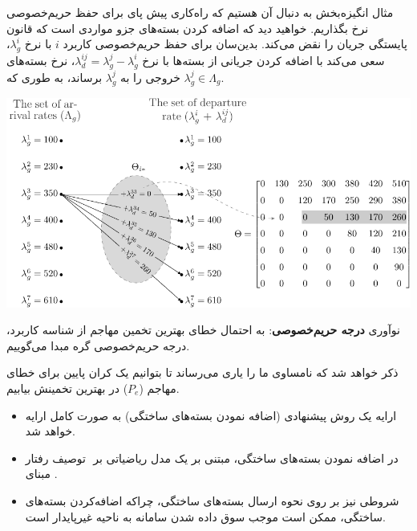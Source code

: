 \documentclass[debug,a0paper,portrait,persian]{xebaposter}
\begin{document}
\begin{poster}
\begin{posterbox}[name=phase3,column=2,span=1,row=0]{مثال انگیزه‌بخش}
به دنبال آن هستیم که راه‌کاری پیش پای  برای حفظ حریم‌خصوصی نرخ بگذاریم. خواهید دید که اضافه کردن بسته‌های
جزو مواردی است که قانون پایستگی جریان را نقض می‌کند. بدین‌سان 
برای حفظ حریم‌خصوصی کاربرد 
$i$  با نرخ $\lambda_g^i$،
سعی می‌کند با اضافه کردن جریانی از بسته‌ها با نرخ  
$\lambda_d^{ij}=\lambda_g^j-\lambda_g^i$،
نرخ بسته‌های خروجی را به 
$\lambda_g^j$
برساند، به طوری که 
$\lambda_g^j\in \Lambda_g$.

\centerline{\includegraphics[width=\linewidth]{images/mappingTable}}


\end{posterbox}
\begin{posterbox}[name=results,column=2,span=1,below=phase3]{نوآوری}
\textbf{درجه حریم‌خصوصی}:
به احتمال خطای بهترین تخمین مهاجم  از  شناسه کاربرد، درجه حریم‌خصوصی گره مبدا می‌گوییم. 

ذکر خواهد شد که نامساوی 
 \cite[قضیه $2.10.1$]{cover2006elements}
ما را یاری می‌رساند تا بتوانیم یک کران پایین برای خطای مهاجم
($P_e$) در بهترین تخمینش 
بیابیم.
\begin{itemize}
\item 
ارایه یک روش پیشنهادی (اضافه نمودن بسته‌های ساختگی) به صورت کامل ارایه خواهد شد.  

\item
توصیف رفتار ‎‎ در اضافه نمودن بسته‌های  ساختگی، مبتنی بر یک مدل ریاضیاتی بر مبنای 
. 
\item
 شروطی نیز بر روی نحوه ارسال بسته‌های ساختگی، چراکه اضافه‌کردن بسته‌های ساختگی، ممکن است موجب سوق‌ داده شدن سامانه به ناحیه غیرپایدار است. 
\end{itemize}
\end{posterbox}



\end{poster}
\end{document}
